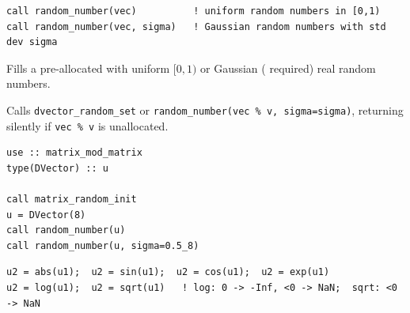 \lstset{language=[95]Fortran}
\begin{lstlisting}
call random_number(vec)          ! uniform random numbers in [0,1)
call random_number(vec, sigma)   ! Gaussian random numbers with std dev sigma
\end{lstlisting}

Fills a pre-allocated  with uniform $[0,1)$ or Gaussian ( required) real random numbers.

Calls \texttt{dvector\_random\_set} or \texttt{random\_number(vec \% v, sigma=sigma)}, returning silently if \texttt{vec \% v} is unallocated.

\begin{description}[leftmargin=2.2cm, style=nextline]
\end{description}

\lstset{language=[95]Fortran}
\begin{lstlisting}
use :: matrix_mod_matrix
type(DVector) :: u

call matrix_random_init
u = DVector(8)
call random_number(u)
call random_number(u, sigma=0.5_8)
\end{lstlisting}



\lstset{language=[95]Fortran}
\begin{lstlisting}
u2 = abs(u1);  u2 = sin(u1);  u2 = cos(u1);  u2 = exp(u1)
u2 = log(u1);  u2 = sqrt(u1)   ! log: 0 -> -Inf, <0 -> NaN;  sqrt: <0 -> NaN
\end{lstlisting}

